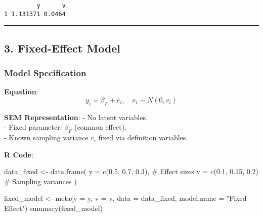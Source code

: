 \documentclass[
  letterpaper,
  DIV=11,
  numbers=noendperiod]{scrartcl}
\newenvironment{Shaded}{\begin{snugshade}}{\end{snugshade}}
\newcommand{\AttributeTok}[1]{\textcolor[rgb]{0.40,0.45,0.13}{#1}}
\newcommand{\CommentTok}[1]{\textcolor[rgb]{0.37,0.37,0.37}{#1}}
\newcommand{\FloatTok}[1]{\textcolor[rgb]{0.68,0.00,0.00}{#1}}
\newcommand{\FunctionTok}[1]{\textcolor[rgb]{0.28,0.35,0.67}{#1}}
\newcommand{\NormalTok}[1]{\textcolor[rgb]{0.00,0.23,0.31}{#1}}
\newcommand{\OtherTok}[1]{\textcolor[rgb]{0.00,0.23,0.31}{#1}}
\newcommand{\StringTok}[1]{\textcolor[rgb]{0.13,0.47,0.30}{#1}}
\begin{document}
\begin{verbatim}
         y      v
1 1.131371 0.0464
\end{verbatim}

\begin{center}\rule{0.5\linewidth}{0.5pt}\end{center}

\subsection{\texorpdfstring{3. \textbf{Fixed-Effect
Model}}{3. Fixed-Effect Model}}\label{fixed-effect-model}

\subsubsection{Model Specification}\label{model-specification}

\textbf{Equation}: \[
y_i = \beta_F + e_i, \quad e_i \sim N(0, v_i)
\]

\textbf{SEM Representation}: - No latent variables.\\
- Fixed parameter: \(\beta_F\) (common effect).\\
- Known sampling variance \(v_i\) fixed via definition variables.

\textbf{R Code}:

\begin{Shaded}
\begin{Highlighting}[]
\NormalTok{data\_fixed }\OtherTok{\textless{}{-}} \FunctionTok{data.frame}\NormalTok{(}
  \AttributeTok{y =} \FunctionTok{c}\NormalTok{(}\FloatTok{0.5}\NormalTok{, }\FloatTok{0.7}\NormalTok{, }\FloatTok{0.3}\NormalTok{),   }\CommentTok{\# Effect sizes}
  \AttributeTok{v =} \FunctionTok{c}\NormalTok{(}\FloatTok{0.1}\NormalTok{, }\FloatTok{0.15}\NormalTok{, }\FloatTok{0.2}\NormalTok{)   }\CommentTok{\# Sampling variances}
\NormalTok{)}

\NormalTok{fixed\_model }\OtherTok{\textless{}{-}} \FunctionTok{meta}\NormalTok{(}\AttributeTok{y =}\NormalTok{ y, }\AttributeTok{v =}\NormalTok{ v, }\AttributeTok{data =}\NormalTok{ data\_fixed, }\AttributeTok{model.name =} \StringTok{"Fixed Effect"}\NormalTok{)}
\FunctionTok{summary}\NormalTok{(fixed\_model)}
\end{Highlighting}
\end{Shaded}
\end{document}
